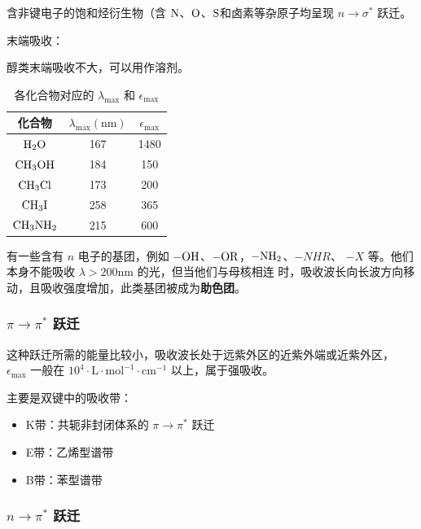 含非键电子的饱和烃衍生物（含 $\ce{N}$、$\ce{O}$、$\ce{S}$和卤素等杂原子均呈现
$n \rightarrow \sigma^*$ 跃迁。

末端吸收：

醇类末端吸收不大，可以用作溶剂。

\begin{table}[H]
    \centering
    \caption{各化合物对应的 $\lambda_{\max}$ 和 $\epsilon_{\max}$}
    \begin{tabular}{ccc}
        \toprule
        化合物           & $\lambda_{\max} (\mathrm{nm})$ & $ \epsilon_{\max}$ \\
        \midrule
        $\ce{H2O}$    & 167                            & 1480               \\
        $\ce{CH3OH}$  & 184                            & 150                \\
        $\ce{CH3Cl}$  & 173                            & 200                \\
        $\ce{CH3I}$   & 258                            & 365                \\
        $\ce{CH3NH2}$ & 215                            & 600                \\
        \bottomrule
    \end{tabular}
\end{table}

有一些含有 $n$ 电子的基团，例如 $\ce{-OH}$、$\ce{-OR}$，$\ce{-NH2}$、$-NHR$、
$-X$ 等。他们本身不能吸收 $\lambda > 200 \mathrm{nm}$ 的光，但当他们与母核相连
时，吸收波长向长波方向移动，且吸收强度增加，此类基团被成为\textbf{助色团}。

\subsubsection{$\pi \rightarrow \pi^*$ 跃迁}

这种跃迁所需的能量比较小，吸收波长处于远紫外区的近紫外端或近紫外区，
$\epsilon_{\max}$ 一般在 $10^4 \cdot \mathrm{L} \cdot \mathrm{mol}^{-1} \cdot
    \mathrm{cm}^{-1}$ 以上，属于强吸收。

主要是双键中的吸收带：

\begin{itemize}
    \item K带：共轭非封闭体系的 $\pi \rightarrow \pi^*$ 跃迁
    \item E带：乙烯型谱带
    \item B带：苯型谱带
\end{itemize}

\subsubsection{$n \rightarrow \pi^*$ 跃迁}

